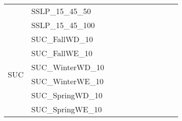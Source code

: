 \begin{table}[]
{\begin{tabular}{|c|l|lll|lll|l|l|l|}
			& SSLP\_15\_45\_50              &                                   &                                 &             &                           &                         &      &                                         &                                 &                                \\
			& SSLP\_15\_45\_100             &                                   &                                 &             &                           &                         &      &                                         &                                 &                                \\ \hline
			\multirow{8}{*}{SUC}     & SUC\_FallWD\_10               &                                   &                                 &             &                           &                         &      &                                         &                                 &                                \\
			& SUC\_FallWE\_10               &                                   &                                 &             &                           &                         &      &                                         &                                 &                                \\
			& SUC\_WinterWD\_10             &                                   &                                 &             &                           &                         &      &                                         &                                 &                                \\
			& SUC\_WinterWE\_10             &                                   &                                 &             &                           &                         &      &                                         &                                 &                                \\
			& SUC\_SpringWD\_10             &                                   &                                 &             &                           &                         &      &                                         &                                 &                                \\
			& SUC\_SpringWE\_10             &                                   &                                 &             &                           &                         &      &                                         &                                 &                                \\

\end{tabular}}
\end{table}
